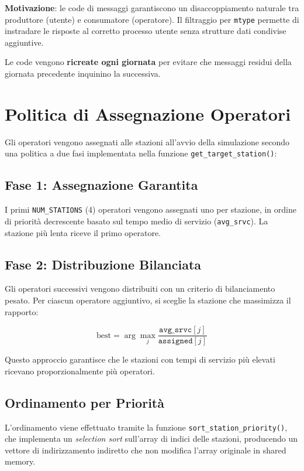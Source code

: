 \documentclass[a4paper,12pt]{article}
\begin{document}
\textbf{Motivazione}: le code di messaggi garantiscono un disaccoppiamento
naturale tra produttore (utente) e consumatore (operatore). Il filtraggio
per \texttt{mtype} permette di instradare le risposte al corretto processo
utente senza strutture dati condivise aggiuntive.

Le code vengono \textbf{ricreate ogni giornata} per evitare che messaggi
residui della giornata precedente inquinino la successiva.

\section{Politica di Assegnazione Operatori}

Gli operatori vengono assegnati alle stazioni all'avvio della simulazione
secondo una politica a due fasi implementata nella funzione
\texttt{get\_target\_station()}:

\subsection{Fase 1: Assegnazione Garantita}

I primi \texttt{NUM\_STATIONS} (4) operatori vengono assegnati
uno per stazione, in ordine di priorità decrescente basato sul
tempo medio di servizio (\texttt{avg\_srvc}). La stazione più
lenta riceve il primo operatore.

\subsection{Fase 2: Distribuzione Bilanciata}

Gli operatori successivi vengono distribuiti con un criterio di
bilanciamento pesato. Per ciascun operatore aggiuntivo, si sceglie
la stazione che massimizza il rapporto:

\[
\text{best} = \arg\max_{j} \frac{\texttt{avg\_srvc}[j]}{\texttt{assigned}[j]}
\]

Questo approccio garantisce che le stazioni con tempi di servizio
più elevati ricevano proporzionalmente più operatori.

\subsection{Ordinamento per Priorità}

L'ordinamento viene effettuato tramite la funzione
\texttt{sort\_station\_priority()}, che implementa un
\textit{selection sort} sull'array di indici delle stazioni,
producendo un vettore di indirizzamento indiretto che non modifica
l'array originale in shared memory.
\end{document}
